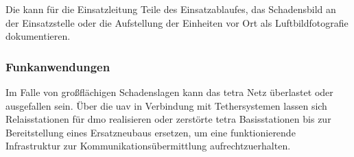 Die \callee{} kann für die Einsatzleitung Teile des Einsatzablaufes, das Schadensbild an der Einsatzstelle oder die Aufstellung der Einheiten vor Ort als Luftbildfotografie dokumentieren.

\subsubsection{Funkanwendungen}

Im Falle von großflächigen Schadenslagen kann das \ac{tetra} Netz überlastet oder ausgefallen sein. Über die \ac{uav} in Verbindung mit Tethersystemen lassen sich Relaisstationen für \ac{dmo} realisieren oder zerstörte \ac{tetra} Basisstationen bis zur Bereitstellung eines Ersatzneubaus ersetzen, um eine funktionierende Infrastruktur zur Kommunikationsübermittlung aufrechtzuerhalten.
